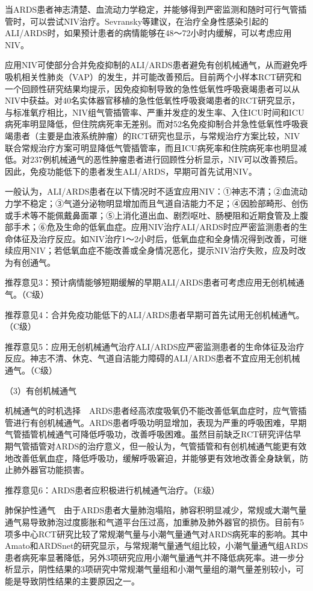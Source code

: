 当ARDS患者神志清楚、血流动力学稳定，并能够得到严密监测和随时可行气管插管时，可以尝试NIV治疗。Sevransky等建议，在治疗全身性感染引起的ALI/ARDS时，如果预计患者的病情能够在48～72小时内缓解，可以考虑应用NIV。

应用NIV可使部分合并免疫抑制的ALI/ARDS患者避免有创机械通气，从而避免呼吸机相关性肺炎（VAP）的发生，并可能改善预后。目前两个小样本RCT研究和一个回顾性研究结果均提示，因免疫抑制导致的急性低氧性呼吸衰竭患者可以从NIV中获益。对40名实体器官移植的急性低氧性呼吸衰竭患者的RCT研究显示，与标准氧疗相比，NIV组气管插管率、严重并发症的发生率、入住ICU时间和ICU病死率明显降低，但住院病死率无差别。而对52名免疫抑制合并急性低氧性呼吸衰竭患者（主要是血液系统肿瘤）的RCT研究也显示，与常规治疗方案比较，NIV联合常规治疗方案可明显降低气管插管率，而且ICU病死率和住院病死率也明显减低。对237例机械通气的恶性肿瘤患者进行回顾性分析显示，NIV可以改善预后。因此，免疫功能低下的患者发生ALI/ARDS，早期可首先试用NIV。

一般认为，ALI/ARDS患者在以下情况时不适宜应用NIV：①神志不清；②血流动力学不稳定；③气道分泌物明显增加而且气道自洁能力不足；④因脸部畸形、创伤或手术等不能佩戴鼻面罩；⑤上消化道出血、剧烈呕吐、肠梗阻和近期食管及上腹部手术；⑥危及生命的低氧血症。应用NIV治疗ALI/ARDS时应严密监测患者的生命体征及治疗反应。如NIV治疗1～2小时后，低氧血症和全身情况得到改善，可继续应用NIV；若低氧血症不能改善或全身情况恶化，提示NIV治疗失败，应及时改为有创通气。

推荐意见3：预计病情能够短期缓解的早期ALI/ARDS患者可考虑应用无创机械通气。（C级）

推荐意见4：合并免疫功能低下的ALI/ARDS患者早期可首先试用无创机械通气。（C级）

推荐意见5：应用无创机械通气治疗ALI/ARDS应严密监测患者的生命体征及治疗反应。神志不清、休克、气道自洁能力障碍的ALI/ARDS患者不宜应用无创机械通气。（C级）

（3）有创机械通气

机械通气的时机选择　ARDS患者经高浓度吸氧仍不能改善低氧血症时，应气管插管进行有创机械通气。ARDS患者呼吸功明显增加，表现为严重的呼吸困难，早期气管插管机械通气可降低呼吸功，改善呼吸困难。虽然目前缺乏RCT研究评估早期气管插管对ARDS的治疗意义，但一般认为，气管插管和有创机械通气能更有效地改善低氧血症，降低呼吸功，缓解呼吸窘迫，并能够更有效地改善全身缺氧，防止肺外器官功能损害。

推荐意见6：ARDS患者应积极进行机械通气治疗。（E级）

肺保护性通气　由于ARDS患者大量肺泡塌陷，肺容积明显减少，常规或大潮气量通气易导致肺泡过度膨胀和气道平台压过高，加重肺及肺外器官的损伤。目前有5项多中心RCT研究比较了常规潮气量与小潮气量通气对ARDS病死率的影响。其中Amato和ARDSnet的研究显示，与常规潮气量通气组比较，小潮气量通气组ARDS患者病死率显著降低，另外3项研究应用小潮气量通气并不降低病死率。进一步分析显示，阴性结果的3项研究中常规潮气量组和小潮气量组的潮气量差别较小，可能是导致阴性结果的主要原因之一。

